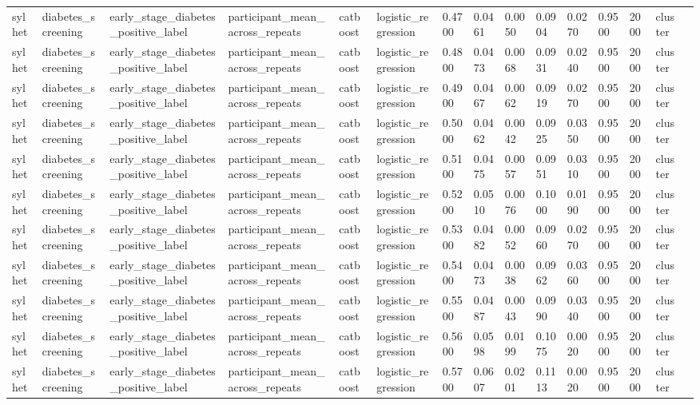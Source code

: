 \begin{tabular}{lllllllllllllll}
sylhet & diabetes\_screening & early\_stage\_diabetes\_positive\_label & participant\_mean\_across\_repeats & catboost & logistic\_regression & 0.4700 & 0.0461 & 0.0050 & 0.0904 & 0.0270 & 0.9500 & 2000 & cluster &  \\
sylhet & diabetes\_screening & early\_stage\_diabetes\_positive\_label & participant\_mean\_across\_repeats & catboost & logistic\_regression & 0.4800 & 0.0473 & 0.0068 & 0.0931 & 0.0240 & 0.9500 & 2000 & cluster &  \\
sylhet & diabetes\_screening & early\_stage\_diabetes\_positive\_label & participant\_mean\_across\_repeats & catboost & logistic\_regression & 0.4900 & 0.0467 & 0.0062 & 0.0919 & 0.0270 & 0.9500 & 2000 & cluster &  \\
sylhet & diabetes\_screening & early\_stage\_diabetes\_positive\_label & participant\_mean\_across\_repeats & catboost & logistic\_regression & 0.5000 & 0.0462 & 0.0042 & 0.0925 & 0.0350 & 0.9500 & 2000 & cluster &  \\
sylhet & diabetes\_screening & early\_stage\_diabetes\_positive\_label & participant\_mean\_across\_repeats & catboost & logistic\_regression & 0.5100 & 0.0475 & 0.0057 & 0.0951 & 0.0310 & 0.9500 & 2000 & cluster &  \\
sylhet & diabetes\_screening & early\_stage\_diabetes\_positive\_label & participant\_mean\_across\_repeats & catboost & logistic\_regression & 0.5200 & 0.0510 & 0.0076 & 0.1000 & 0.0190 & 0.9500 & 2000 & cluster &  \\
sylhet & diabetes\_screening & early\_stage\_diabetes\_positive\_label & participant\_mean\_across\_repeats & catboost & logistic\_regression & 0.5300 & 0.0482 & 0.0052 & 0.0960 & 0.0270 & 0.9500 & 2000 & cluster &  \\
sylhet & diabetes\_screening & early\_stage\_diabetes\_positive\_label & participant\_mean\_across\_repeats & catboost & logistic\_regression & 0.5400 & 0.0473 & 0.0038 & 0.0962 & 0.0360 & 0.9500 & 2000 & cluster &  \\
sylhet & diabetes\_screening & early\_stage\_diabetes\_positive\_label & participant\_mean\_across\_repeats & catboost & logistic\_regression & 0.5500 & 0.0487 & 0.0043 & 0.0990 & 0.0340 & 0.9500 & 2000 & cluster &  \\
sylhet & diabetes\_screening & early\_stage\_diabetes\_positive\_label & participant\_mean\_across\_repeats & catboost & logistic\_regression & 0.5600 & 0.0598 & 0.0199 & 0.1075 & 0.0020 & 0.9500 & 2000 & cluster &  \\
sylhet & diabetes\_screening & early\_stage\_diabetes\_positive\_label & participant\_mean\_across\_repeats & catboost & logistic\_regression & 0.5700 & 0.0607 & 0.0201 & 0.1113 & 0.0020 & 0.9500 & 2000 & cluster &  \\

\end{tabular}
